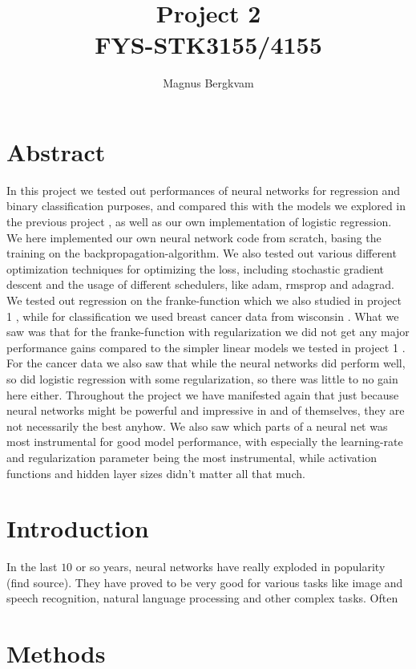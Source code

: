 \documentclass{article}
\title{Project 2 \\ FYS-STK3155/4155}
\author{Magnus Bergkvam}
\begin{document}
\maketitle


\section{Abstract}
In this project we tested out performances of neural networks for regression and
binary classification purposes, and compared this with the models we explored in
the previous project \cite{githubrepoproject1}, as well as our own
implementation of logistic regression. We here implemented our own neural
network code from scratch, basing the training on the backpropagation-algorithm.
We also tested out various different optimization techniques for optimizing the
loss, including stochastic gradient descent and the usage of different
schedulers, like adam, rmsprop and adagrad. We tested out regression on the
franke-function which we also studied in project 1 \cite{githubrepoproject1},
while for classification we used breast cancer data from wisconsin
\cite{sklearncancerdata} \cite{breastcancerwisconsin}. What we saw was that for
the franke-function with regularization we did not get any major performance
gains compared to the simpler linear models we tested in project 1
\cite{githubrepoproject1}. For the cancer data we also saw that while the neural
networks did perform well, so did logistic regression with some regularization,
so there was little to no gain here either. Throughout the project we have
manifested again that just because neural networks might be powerful and
impressive in and of themselves, they are not necessarily the best anyhow. We
also saw which parts of a neural net was most instrumental for good model
performance, with especially the learning-rate and regularization parameter
being the most instrumental, while activation functions and hidden layer sizes
didn't matter all that much.

\section{Introduction}
In the last $10$ or so years, neural networks have really exploded in
popularity (find source). They have proved to be very good for various tasks
like image and speech recognition, natural language processing and other complex
tasks. Often

\section{Methods}
\end{document}

